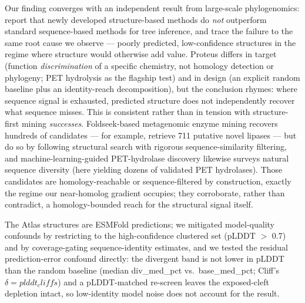 Our finding converges with an independent result from large-scale phylogenomics:
\citet{mutti2025} report that newly developed structure-based methods do \emph{not}
outperform standard sequence-based methods for tree inference, and trace the failure
to the same root cause we observe --- poorly predicted, low-confidence structures in
the regime where structure would otherwise add value. Proteus differs in target
(function \emph{discrimination} of a specific chemistry, not homology detection or
phylogeny; PET hydrolysis as the flagship test) and in design (an explicit random
baseline plus an identity-reach decomposition), but the conclusion rhymes: where
sequence signal is exhausted, predicted structure does not independently recover what
sequence misses. This is consistent rather than in tension with structure-first
mining \emph{successes}. Foldseek-based metagenomic enzyme mining recovers hundreds of
candidates --- for example, \citet{jaito2026} retrieve 711 putative novel lipases ---
but do so by following structural search with rigorous sequence-similarity filtering,
and machine-learning-guided PET-hydrolase discovery \citep{nortonbaker2025} likewise
surveys natural sequence diversity (here yielding dozens of validated PET hydrolases).
Those candidates are homology-reachable or sequence-filtered by construction, exactly
the regime our near-homolog gradient occupies; they corroborate, rather than
contradict, a homology-bounded reach for the structural signal itself.



The Atlas structures are ESMFold predictions; we mitigated model-quality confounds by
restricting to the high-confidence clustered set (pLDDT $>$ 0.7) and by coverage-gating
sequence-identity estimates, and we tested the residual prediction-error confound
directly: the divergent band is not lower in pLDDT than the random baseline (median
{{div_med_pct}} vs.\ {{base_med_pct}}; Cliff's $\delta={{plddt_cliffs}}$) and a
pLDDT-matched re-screen leaves the exposed-cleft depletion intact, so low-identity
model noise does not account for the result.


